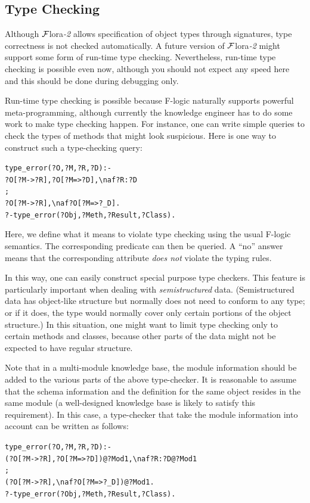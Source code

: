 \documentclass[11pt]{article}
\newcommand{\FLORA}{{\mbox{\sc ${\cal F}${lora}\rm\emph{-2}}}\xspace}
\newcommand{\FLSYSTEM}{\FLORA}
\newcommand{\bs}{\textbackslash}
\newcommand{\fl}{\mbox{F-logic}\xspace}
\newcommand{\RULELOGNAF}{{\texttt{{\bs}naf}}\xspace}
\begin{document}
\subsection{Type Checking}\label{sec-typechecking}

Although \FLSYSTEM allows specification of object types through signatures,
type correctness is not checked automatically.
A future version of \FLSYSTEM might support some form of run-time type
checking. Nevertheless, run-time type checking is possible even now,
although you should not expect any speed here and this should be done
during debugging only.

Run-time type checking is possible because \fl naturally supports powerful
meta-programming, although currently the knowledge engineer
has to do some work to
make type checking happen.  For instance, one can write simple
queries to check the types of methods that might look suspicious.  Here is
one way to construct such a type-checking query:
\begin{alltt}
type_error(?O,?M,?R,?D) :-
       ?O[?M->?R], ?O[?M=>?D], \RULELOGNAF ?R:?D
       ;
       ?O[?M->?R], \RULELOGNAF ?O[?M=>?_D].
?- type_error(?Obj,?Meth,?Result,?Class).
\end{alltt}
Here, we define what it means to violate type checking using the usual
\fl semantics. The corresponding predicate can then be queried. A
``no'' answer means that the corresponding attribute \emph{does not}
violate the typing rules.

In this way, one can easily construct special purpose type checkers.  This
feature is particularly important when dealing with \emph{semistructured}
data. (Semistructured data has object-like structure but normally does not
need to conform to any type; or if it does, the type would normally cover
only certain portions of the object structure.) In this situation, one
might want to limit type checking only to certain methods and classes,
because other parts of the data might not be expected to have regular
structure.

Note that in a multi-module knowledge base, the module information should be added
to the various parts of the above type-checker. It is reasonable to assume
that the schema information and the definition for the same object
resides in the same module (a well-designed knowledge base is likely to satisfy
this requirement). In this case, a type-checker that take the module
information into account can be written as follows:
\begin{alltt}
type_error(?O,?M,?R,?D) :-
       (?O[?M->?R], ?O[?M=>?D])@?Mod1, \RULELOGNAF ?R:?D@?Mod1
       ;
       (?O[?M->?R], \RULELOGNAF ?O[?M=>?_D])@?Mod1.
?- type_error(?Obj,?Meth,?Result,?Class).
\end{alltt}
\end{document}
